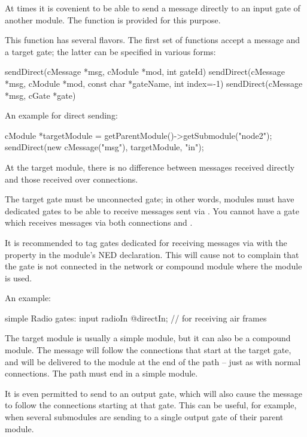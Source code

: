 At times it is covenient to be able to send a message directly to an input
gate of another module. The  function is provided for
this purpose.

This function has several flavors. The first set of 
functions accept a message and a target gate; the latter can be specified
in various forms:

\begin{cpp}
sendDirect(cMessage *msg, cModule *mod, int gateId)
sendDirect(cMessage *msg, cModule *mod, const char *gateName, int index=-1)
sendDirect(cMessage *msg, cGate *gate)
\end{cpp}

An example for direct sending:

\begin{cpp}
cModule *targetModule = getParentModule()->getSubmodule("node2");
sendDirect(new cMessage("msg"), targetModule, "in");
\end{cpp}

At the target module, there is no difference between messages received
directly and those received over connections.

The target gate must be unconnected gate; in other words,
modules must have dedicated gates to be able to receive messages
sent via . You cannot have a gate which receives
messages via both connections and .

It is recommended to tag gates dedicated for receiving messages via
 with the  property in the module's NED
declaration. This will cause {\opp} not to complain that the gate is not
connected in the network or compound module where the module is used.

An example:

\begin{ned}
simple Radio {
    gates:
        input radioIn @directIn; // for receiving air frames
}
\end{ned}

The target module is usually a simple module, but it can also be a compound
module. The message will follow the connections that start at the target
gate, and will be delivered to the module at the end of the path -- just as
with normal connections. The path must end in a simple module.

It is even permitted to send to an output gate, which will also cause the
message to follow the connections starting at that gate.
This can be useful, for example, when several submodules are sending
to a single output gate of their parent module.

